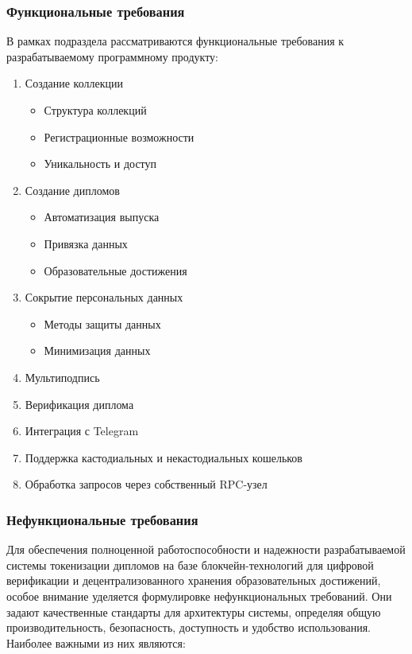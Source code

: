 \subsubsection{Функциональные требования}
\label{subsec:func_req}

В рамках подраздела рассматриваются функциональные требования к разрабатываемому программному продукту:

\begin{enumerate}
    \item Создание коллекции
    \begin{itemize}
        \item Структура коллекций
        \item Регистрационные возможности
        \item Уникальность и доступ
    \end{itemize}
    \item Создание дипломов
    \begin{itemize}
        \item Автоматизация выпуска
        \item Привязка данных
        \item Образовательные достижения
    \end{itemize}
    \item Сокрытие персональных данных
    \begin{itemize}
        \item Методы защиты данных
        \item Минимизация данных
    \end{itemize}
    \item Мультиподпись
    \item Верификация диплома
    \item Интеграция с Telegram
    \item Поддержка кастодиальных и некастодиальных кошельков
    \item Обработка запросов через собственный RPC-узел
\end{enumerate}

\subsubsection{Нефункциональные требования}
\label{subsec:nonfunc_req}

Для обеспечения полноценной работоспособности и надежности разрабатываемой системы токенизации дипломов на базе блокчейн-технологий для цифровой верификации и децентрализованного хранения образовательных достижений, особое внимание уделяется формулировке нефункциональных требований. Они задают качественные стандарты для архитектуры системы, определяя общую производительность, безопасность, доступность и удобство использования. Наиболее важными из них являются:

